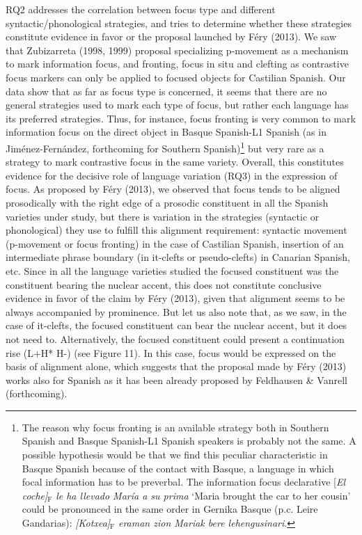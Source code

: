 \documentclass[11pt]{article}
\newcommand\textsubscript[1]{\ensuremath{{}_{\text{#1}}}}
\newenvironment{styleStandard}{\setlength\leftskip{0cm}\setlength\rightskip{0cm plus 1fil}\setlength\parindent{0cm}\setlength\parfillskip{0pt plus 1fil}\setlength\parskip{0in plus 1pt}\writerlistparindent\writerlistleftskip\leavevmode\normalfont\normalsize\writerlistlabel\ignorespaces}{\unskip\vspace{0.139in plus 0.0139in}\par}
\newcommand\writerlistleftskip{}
\newcommand\writerlistparindent{}
\newcommand\writerlistlabel{}
\begin{document}
\begin{styleStandard}
RQ2 addresses the correlation between focus type and different syntactic/phonological strategies, and tries to determine whether these strategies constitute evidence in favor or the proposal launched by Féry (2013). We saw that Zubizarreta (1998, 1999) proposal specializing p-movement as a mechanism to mark information focus, and fronting, focus in situ and clefting as contrastive focus markers can only be applied to focused objects for Castilian Spanish. Our data show that as far as focus type is concerned, it seems that there are no general strategies used to mark each type of focus, but rather each language has its preferred strategies. Thus, for instance, focus fronting is very common to mark information focus on the direct object in Basque Spanish-L1 Spanish (as in Jiménez-Fernández, forthcoming for Southern Spanish)\footnote{ The reason why focus fronting is an available strategy both in Southern Spanish and Basque Spanish-L1 Spanish speakers is probably not the same. A possible hypothesis would be that we find this peculiar characteristic in Basque Spanish because of the contact with Basque, a language in which focal information has to be preverbal. The information focus declarative [\textit{El coche]}\textsc{\textsubscript{F}}\textit{ le ha llevado María a su prima }‘Maria brought the car to her cousin’ could be pronounced in the same order in Gernika Basque (p.c. Leire Gandarias): \textit{[Kotxea]}\textsc{\textsubscript{F}}\textit{ eraman zion Mariak bere lehengusinari}.} but very rare as a strategy to mark contrastive focus in the same variety. Overall, this constitutes evidence for the decisive role of language variation (RQ3) in the expression of focus. As proposed by Féry (2013), we observed that focus tends to be aligned prosodically with the right edge of a prosodic constituent in all the Spanish varieties under study, but there is variation in the strategies (syntactic or phonological) they use to fulfill this alignment requirement: syntactic movement (p-movement or focus fronting) in the case of Castilian Spanish, insertion of an intermediate phrase boundary (in it-clefts or pseudo-clefts) in Canarian Spanish, etc. Since in all the language varieties studied the focused constituent was the constituent bearing the nuclear accent, this does not constitute conclusive evidence in favor of the claim by Féry (2013), given that alignment seems to be always accompanied by prominence. But let us also note that, as we saw, in the case of it-clefts, the focused constituent can bear the nuclear accent, but it does not need to. Alternatively, the focused constituent could present a continuation rise (L+H* H-) (see Figure 11). In this case, focus would be expressed on the basis of alignment alone, which suggests that the proposal made by Féry (2013) works also for Spanish as it has been already proposed by Feldhausen \& Vanrell (forthcoming).
\end{styleStandard}
\end{document}
